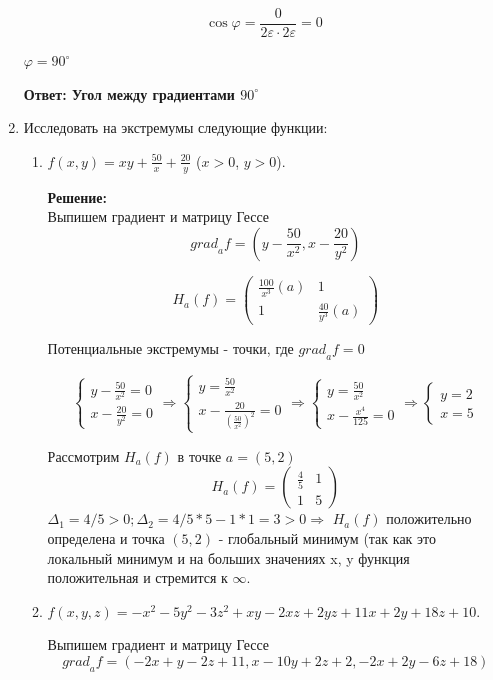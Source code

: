 \documentclass[a4paper,12pt]{article}
\newcounter{z}
\begin{document}
\begin{enumerate}
$$\cos\varphi=\frac{0}{2\varepsilon\cdot2\varepsilon}=0$$

$\varphi=90^{\circ}$


\textbf{Ответ: Угол между градиентами $90^{\circ}$}

\item Исследовать на экстремумы следующие функции:
\begin{enumerate}
\item $f(x,y) = xy + \frac{50}{x} + \frac{20}{y}$ ($x > 0$, $y>0$).

\textbf{Решение:}\\
Выпишем градиент и матрицу Гессе
$${grad}_af = (y-\frac{50}{x^2}, x-\frac{20}{y^2})$$


$$H_a(f) = \begin{pmatrix}
\frac{100}{x^3}(a)  &  1  \\
 1 & \frac{40}{y^3}(a) 
\end{pmatrix}$$

Потенциальные экстремумы - точки, где ${grad}_af = 0$

$$\begin{cases} y-\frac{50}{x^2}=0 \\ x-\frac{20}{y^2}=0\end{cases} \Rightarrow \begin{cases} y=\frac{50}{x^2} \\ x-\frac{20}{(\frac{50}{x^2})^2}=0\end{cases}\Rightarrow   \begin{cases} y=\frac{50}{x^2} \\ x-\frac{x^4}{125}=0\end{cases}\Rightarrow   \begin{cases} y=2 \\ x=5\end{cases}$$

Рассмотрим $H_a(f)$ в точке $a=(5,2)$
$$H_a(f) = \begin{pmatrix}
\frac{4}{5}  &  1  \\
 1 & 5 
\end{pmatrix}$$
$\Delta_1 = 4/5 > 0; \Delta_2 = 4/5*5-1*1 = 3>0 \Rightarrow$ $H_a(f)$ положительно определена и точка $(5,2)$ - глобальный минимум (так как это локальный минимум и на больших значениях x, y функция положительная и стремится к $\infty$.

\item $f(x,y,z)=-x^2-5y^2-3z^2+xy-2xz+2yz+11x+2y+18z+10$.

Выпишем градиент и матрицу Гессе
$${grad}_af = (-2x+y-2z+11, x-10y+2z+2, -2x+2y-6z+18)$$



\end{enumerate}
\end{enumerate}
\end{document}
